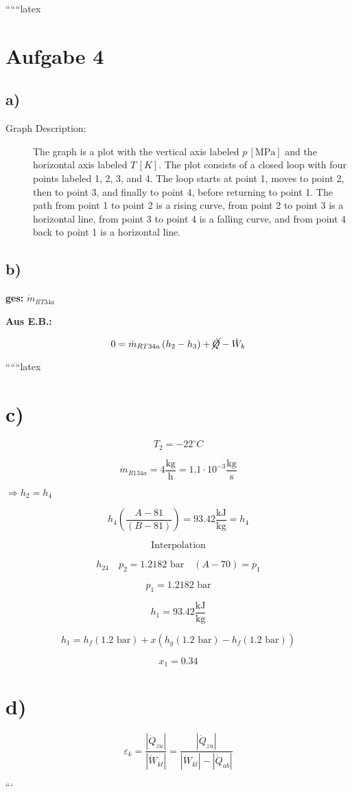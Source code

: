 
``````latex


\section*{Aufgabe 4}

\subsection*{a)}

\begin{description}
    \item[Graph Description:] The graph is a plot with the vertical axis labeled $p \, [\text{MPa}]$ and the horizontal axis labeled $T \, [K]$. The plot consists of a closed loop with four points labeled 1, 2, 3, and 4. The loop starts at point 1, moves to point 2, then to point 3, and finally to point 4, before returning to point 1. The path from point 1 to point 2 is a rising curve, from point 2 to point 3 is a horizontal line, from point 3 to point 4 is a falling curve, and from point 4 back to point 1 is a horizontal line.
\end{description}

\subsection*{b)}

\textbf{ges:} $\dot{m}_{RT34a}$

\textbf{Aus E.B.:}

\[
0 = \dot{m}_{RT34a} \left( h_2 - h_3 \right) + \cancel{\dot{Q}} - \dot{W}_k
\]

``````latex


\section*{c)}

\[
T_2 = -22^\circ C
\]

\[
\dot{m}_{R134a} = 4 \frac{\text{kg}}{\text{h}} = 1.1 \cdot 10^{-3} \frac{\text{kg}}{\text{s}}
\]

 \(\Rightarrow h_2 = h_4\)

\[
h_4 \left( \frac{A-81}{(B-81)} \right) = 93.42 \frac{\text{kJ}}{\text{kg}} = h_4
\]

\[
\text{Interpolation}
\]

\[
h_{24} \quad p_2 = 1.2182 \text{ bar} \quad (A-70) = p_1
\]

\[
p_1 = 1.2182 \text{ bar}
\]

\[
h_1 = 93.42 \frac{\text{kJ}}{\text{kg}}
\]

\[
h_1 = h_f (1.2 \text{ bar}) + x \left( h_g (1.2 \text{ bar}) - h_f (1.2 \text{ bar}) \right)
\]

\[
x_1 = 0.34
\]

\section*{d)}

\[
\varepsilon_k = \frac{|\dot{Q}_{zu}|}{|\dot{W}_{kl}|} = \frac{|\dot{Q}_{zu}|}{|\dot{W}_{kl}| - |\dot{Q}_{ab}|}
\]

```